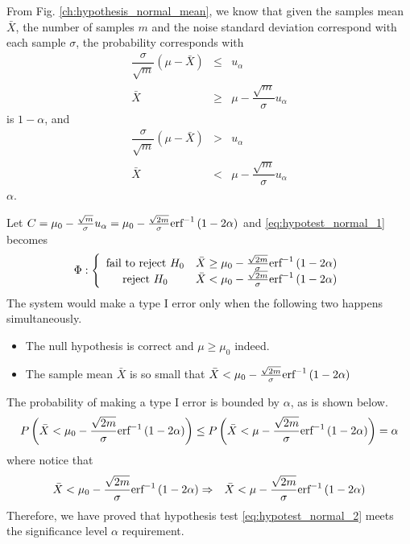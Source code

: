 From Fig. \ref{ch:hypothesis_normal_mean}, we know that given the samples mean $\bar{X}$, the number of samples $m$ and the noise standard deviation correspond with each sample $\sigma$, the probability corresponds with 
\begin{eqnarray}
  \dfrac{\sigma}{\sqrt{m}}\left(\mu - \bar{X}\right) &\leq& u_{\alpha} \nonumber \\
  \bar{X} &\geq& \mu - \dfrac{\sqrt{m}}{\sigma}u_{\alpha} \nonumber
\end{eqnarray}
is $1 - \alpha$, and
\begin{eqnarray}
  \dfrac{\sigma}{\sqrt{m}}\left(\mu - \bar{X}\right) &>& u_{\alpha} \nonumber \\
  \bar{X} &<& \mu - \dfrac{\sqrt{m}}{\sigma}u_{\alpha} \nonumber
\end{eqnarray}
$\alpha$.

Let $C=\mu_0 - \frac{\sqrt{m}}{\sigma}u_{\alpha} = \mu_0 - \frac{\sqrt{2m}}{\sigma}\textup{erf}^{-1}\left(1-2\alpha\right)$ and \eqref{eq:hypotest_normal_1} becomes
\begin{eqnarray}
	\Phi : \left\{\begin{array}{cc}
		\textup{fail to reject~} H_0 & \bar{X} \geq \mu_0 - \frac{\sqrt{2m}}{\sigma}\textup{erf}^{-1}\left(1-2\alpha\right) \\
		\textup{reject~} H_0 & \bar{X} < \mu_0 - \frac{\sqrt{2m}}{\sigma}\textup{erf}^{-1}\left(1-2\alpha\right)
	\end{array}\right. \label{eq:hypotest_normal_2}
\end{eqnarray}
The system would make a type I error only when the following two happens simultaneously.
\begin{itemize}
  \item The null hypothesis is correct and $\mu \geq \mu_0$ indeed.
  \item The sample mean $\bar{X}$ is so small that $\bar{X} < \mu_0 - \frac{\sqrt{2m}}{\sigma}\textup{erf}^{-1}\left(1-2\alpha\right)$
\end{itemize}
The probability of making a type I error is bounded by $\alpha$, as is shown below.
\begin{eqnarray}
  P\left(\bar{X} < \mu_0 - \frac{\sqrt{2m}}{\sigma}\textup{erf}^{-1}\left(1-2\alpha\right)\right) \leq P\left(\bar{X} < \mu - \frac{\sqrt{2m}}{\sigma}\textup{erf}^{-1}\left(1-2\alpha\right)\right) = \alpha \nonumber
\end{eqnarray}
where notice that
\begin{eqnarray}
  \bar{X} < \mu_0 - \frac{\sqrt{2m}}{\sigma}\textup{erf}^{-1}\left(1-2\alpha\right) &\Rightarrow& \bar{X} < \mu - \frac{\sqrt{2m}}{\sigma}\textup{erf}^{-1}\left(1-2\alpha\right) \nonumber
\end{eqnarray}
Therefore, we have proved that hypothesis test \eqref{eq:hypotest_normal_2} meets the significance level $\alpha$ requirement.

